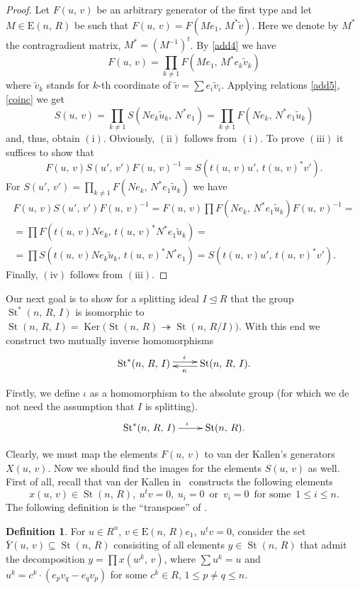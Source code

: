 \documentclass[11pt]{amsart}
\theoremstyle{plain} \declaretheorem[name=Theorem, Refname={Theorem,Theorems}]{tm} \Crefname{tm}{Theorem}{Theorems}
\numberwithin{equation}{section}
\theoremstyle{definition} \newtheorem{df}[lm]{Definition} \Crefname{df}{Definition}{Definitions}
\theoremstyle{remark} \newtheorem{rk}[lm]{Remark} \Crefname{rk}{Remark}{Remarks}
\newcommand{\Ker}{\mathop{\mathrm{Ker}}\nolimits}
\newcommand{\E}{{\mathrm{E}}}
\newcommand{\St}{\mathop{\mathrm{St}}\nolimits}
\newcommand{\epi}{\twoheadrightarrow}
\newcommand{\inv}{^{-1}}
\begin{document}
\begin{proof}
Let $F(u,\,v)$ be an arbitrary generator of the first type and let $M\in\E(n,\,R)$ be such that $F(u,\,v)=F(Me_1,\,M^*\tilde v)$. 
Here we denote by $M^*$ the contragradient matrix, $M^*=(M\inv)^t$. 
By \eqref{add4} we have $$F(u,\,v)=\prod\limits_{k\neq1}F(Me_1,\,M^*e_k\tilde v_k)$$
where $\tilde v_k$ stands for $k$-th coordinate of $\tilde v=\sum e_i\tilde v_i$.
Applying relations \eqref{add5}, \eqref{coinc} we get
$$S(u,\,v)=\prod\limits_{k\neq1}S(Ne_k\tilde u_k,\,N^*e_1)=\prod\limits_{k\neq1}F(Ne_k,\,N^*e_1\tilde u_k)$$
and, thus, obtain $(\mathrm{i})$. Obviously, $(\mathrm{ii})$ follows from $(\mathrm{i})$. 
To prove $(\mathrm{iii})$ it suffices to show that
$$F(u,\,v)S(u',\,v')F(u,\,v)\inv=S(t(u,\,v)u',\,t(u,\,v)^*v').$$
For $S(u',\,v')=\prod_{k\neq 1} F(Ne_k,\,N^*e_1\tilde u_k)$ we have
\begin{multline*}
F(u,\,v)S(u',\,v')F(u,\,v)\inv=F(u,\,v)\prod F(Ne_k,\,N^*e_1\tilde u_k)F(u,\,v)\inv=\\
=\prod F(t(u,\,v)Ne_k,\,t(u,\,v)^*N^*e_1\tilde u_k)=\\
=\prod S(t(u,\,v)Ne_k\tilde u_k,\,t(u,\,v)^*N^*e_1)=S(t(u,\,v)u',\,t(u,\,v)^*v').
\end{multline*}
Finally, $(\mathrm{iv})$ follows from $(\mathrm{iii})$.
\end{proof}

Our next goal is to show for a splitting ideal $I\trianglelefteq R$ that the group $\St^*(n,\,R,\,I)$ is isomorphic to $\St(n,\,R,\,I)=\Ker\big(\St(n,\,R)\epi\St(n,\,R/I)\big)$.
With this end we construct two mutually inverse homomorphisms
$$\xymatrix{\St^*(n,\,R,\,I)\ar@<0.5ex>[r]^{\iota}&\St(n,\,R,\,I)\ar@<0.5ex>[l]^{\kappa}.}$$

Firstly, we define $\iota$ as a homomorphism to the absolute group (for which we de not need the assumption that $I$ is splitting).
$$\xymatrix{\St^*(n,\,R,\,I)\ar@<0.0ex>[r]^{\iota}&\St(n,\,R).}$$

Clearly, we must map the elements $F(u,\,v)$ to van der Kallen's generators $X(u,\,v)$.
Now we should find the images for the elements $S(u,\,v)$ as well.
First of all, recall that van der Kallen in~\cite[3.8--3.10]{vdK} constructs the following elements
$$x(u,\,v)\in\St(n,\,R),\ u^tv=0,\ u_i=0\,\text{ or }\,v_i=0\,\text{ for some }\,1\leq i\leq n.$$
The following definition is the ``transpose'' of \cite[3.13]{vdK}.
\begin{df} For $u\in R^n$, $v\in\E(n,\,R)e_1$, $u^tv=0$, consider the set $\overline Y(u,\,v)\subseteq\St(n,\,R)$
 consisiting of all elements $y\in\St(n,\,R)$ that admit the decomposition $y=\prod x(w^k,\,v)$, 
 where $\sum u^k=u$ and $u^k=c^k \cdot (e_pv_q-e_qv_p)$ for some $c^k\in R$, $1\leq p\neq q\leq n$. \end{df}
\end{document}
